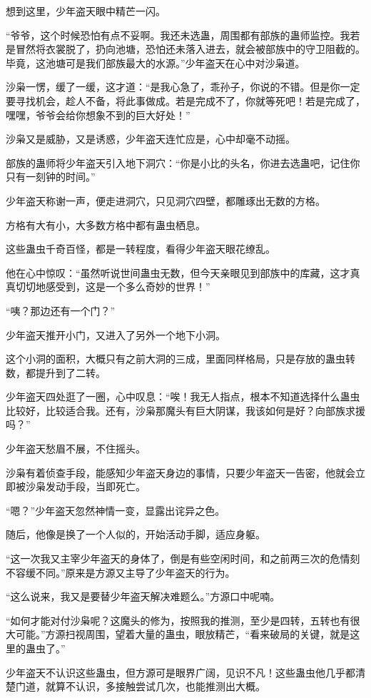 \begin{this_body}
想到这里，少年盗天眼中精芒一闪。

“爷爷，这个时候恐怕有点不妥啊。我还未选蛊，周围都有部族的蛊师监控。我若是冒然将衣裳脱了，扔向池塘，恐怕还未落入进去，就会被部族中的守卫阻截的。毕竟，这池塘可是我们部族最大的水源。”少年盗天在心中对沙枭道。

沙枭一愣，缓了一缓，这才道：“是我心急了，乖孙子，你说的不错。但是你一定要寻找机会，趁人不备，将此事做成。若是完成不了，你就等死吧！若是完成了，嘿嘿，爷爷会给你想象不到的巨大好处！”

沙枭又是威胁，又是诱惑，少年盗天连忙应是，心中却毫不动摇。

部族的蛊师将少年盗天引入地下洞穴：“你是小比的头名，你进去选蛊吧，记住你只有一刻钟的时间。”

少年盗天称谢一声，便走进洞穴，只见洞穴四壁，都雕琢出无数的方格。

方格有大有小，大多数方格中都有蛊虫栖息。

这些蛊虫千奇百怪，都是一转程度，看得少年盗天眼花缭乱。

他在心中惊叹：“虽然听说世间蛊虫无数，但今天亲眼见到部族中的库藏，这才真真切切地感受到，这是一个多么奇妙的世界！”

“咦？那边还有一个门？”

少年盗天推开小门，又进入了另外一个地下小洞。

这个小洞的面积，大概只有之前大洞的三成，里面同样格局，只是存放的蛊虫转数，都提升到了二转。

少年盗天四处逛了一圈，心中叹息：“唉！我无人指点，根本不知道选择什么蛊虫比较好，比较适合我。还有，沙枭那魔头有巨大阴谋，我该如何是好？向部族求援吗？”

少年盗天愁眉不展，不住摇头。

沙枭有着侦查手段，能感知少年盗天身边的事情，只要少年盗天一告密，他就会立即被沙枭发动手段，当即死亡。

“嗯？”少年盗天忽然神情一变，显露出诧异之色。

随后，他像是换了一个人似的，开始活动手脚，适应身躯。

“这一次我又主宰少年盗天的身体了，倒是有些空闲时间，和之前两三次的危情刻不容缓不同。”原来是方源又主导了少年盗天的行为。

“这么说来，我又是要替少年盗天解决难题么。”方源口中呢喃。

“如何才能对付沙枭呢？这魔头的修为，按照我的推测，至少是四转，五转也有很大可能。”方源扫视周围，望着大量的蛊虫，眼放精芒，“看来破局的关键，就是这里的蛊虫了。”

少年盗天不认识这些蛊虫，但方源可是眼界广阔，见识不凡！这些蛊虫他几乎都清楚门道，就算不认识，多接触尝试几次，也能推测出大概。


\end{this_body}
